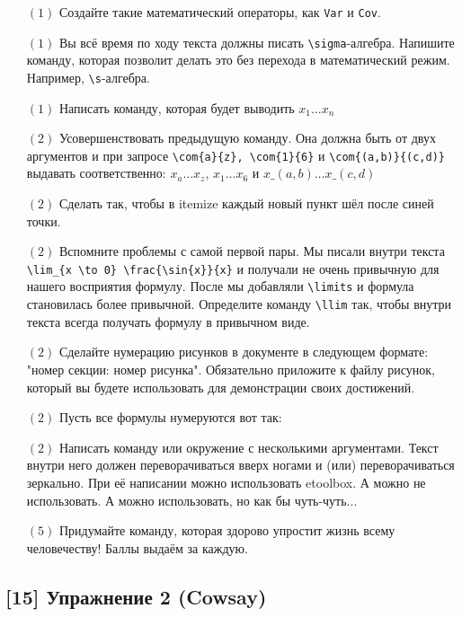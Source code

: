 \documentclass[12pt, a4paper, oneside]{article}
\begin{document}
\begin{itemize}
	\item[$(1)$] Создайте такие математический операторы, как \verb|Var| и \verb|Cov|.
	\item[$(1)$] Вы всё время по ходу текста должны писать \verb|\sigma|-алгебра. Напишите команду, которая позволит делать это без перехода в математический режим. Например,  \verb|\s|-алгебра.
	\item[$(1)$] Написать команду, которая будет выводить $x_1 \ldots x_n$
	\item[$(2)$] Усовершенствовать предыдущую команду. Она должна быть от двух аргументов и при запросе \verb|\com{a}{z}, \com{1}{6}| и \verb|\com{(a,b)}{(c,d)}| выдавать соответственно:  $x_a \ldots x_z$, 
	$x_1 \ldots x_6$ и   $x\_{(a,b)} \ldots x\_{(c,d)}$
	\item[$(2)$] Сделать так, чтобы в itemize каждый новый пункт шёл после синей точки.
	
	
	
	
	\item[$(2)$] Вспомните проблемы с самой первой пары. Мы писали внутри текста \verb|\lim_{x \to 0} \frac{\sin{x}}{x}| и получали не очень привычную для нашего восприятия формулу. После мы добавляли \verb|\limits| и формула становилась более привычной. Определите команду \verb|\llim| так, чтобы внутри текста всегда получать формулу в привычном виде.
	\item[$(2)$] Сделайте нумерацию рисунков в документе в следующем формате: "номер секции: номер рисунка". Обязательно приложите к файлу рисунок, который вы будете использовать для демонстрации своих достижений.
	\item[$(2)$] Пусть все формулы нумеруются вот так: 
	
	
	\item[$(2)$] Написать команду или окружение с несколькими аргументами. Текст внутри него должен переворачиваться вверх ногами и (или) переворачиваться зеркально. При её написании можно использовать etoolbox. А можно не использовать. А можно использовать, но как бы чуть-чуть...
	\item[$(5)$] Придумайте команду, которая здорово упростит жизнь всему человечеству! Баллы выдаём за каждую. 
\end{itemize}

\subsection*{[15]  Упражнение 2  (Cowsay)}
\end{document}
